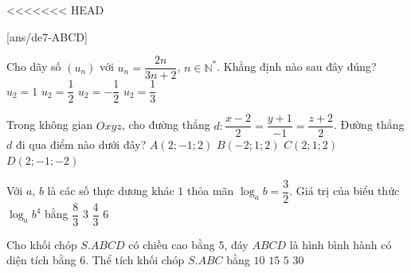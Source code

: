 <<<<<<< HEAD
\begin{name}
	{\tenchude}
	{\tendethi}
	{\tentruong}
	{\thoigian}
	\end{name}
\TN
{}[ans/de7-ABCD]
\begin{ex}%
	Cho dãy số $(u_n)$ với $u_n=\dfrac{2n}{3n+2}$, $n\in\mathbb{N}^*$. Khẳng định nào sau đây đúng?\vspace{3pt}
	\choice
	{$u_2=1$}
	{\True $u_2=\dfrac{1}{2}$}
	{$u_2=-\dfrac{1}{2}$}
	{$u_2=\dfrac{1}{3}$}
\end{ex}
\begin{ex}%
	Trong không gian $Oxyz$, cho đường thẳng $d\colon\dfrac{x-2}{2}=\dfrac{y+1}{-1}=\dfrac{z+2}{2}$. Đường thẳng $d$ đi qua điểm nào dưới đây?
	\choice
	{$A(2;-1;2)$}
	{$B(-2;1;2)$}
	{$C(2;1;2)$}
	{\True $D(2;-1;-2)$}
\end{ex}
\begin{ex}%
	Với $a$, $b$ là các số thực dương khác $1$ thỏa mãn $\log_a b=\dfrac{3}{2}$. Giá trị của biểu thức $\log_a b^4$ bằng\vspace{3pt}
	\choice
	{$\dfrac{8}{3}$}
	{$3$}
	{$\dfrac{4}{3}$}
	{\True $6$}
\end{ex}
\begin{ex}%
	Cho khối chóp $S.ABCD$ có chiều cao bằng $5$, đáy $ABCD$ là hình bình hành có diện tích bằng $6$. Thể tích khối chóp $S.ABC$ bằng
	\choice
	{$10$}
	{$15$}
	{\True $5$}
	{$30$}
\end{ex}
